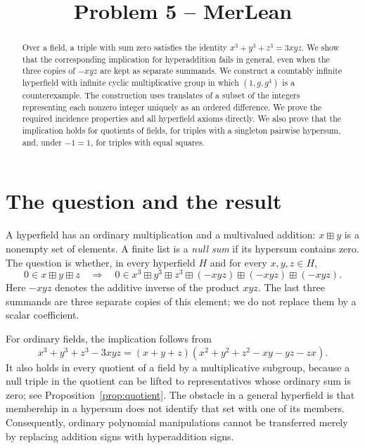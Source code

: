 \documentclass[11pt]{article}
\title{Problem 5 -- MerLean}
\author{}
\date{}
\theoremstyle{remark}
\newcommand{\hs}{\boxplus}
\begin{document}
\maketitle

\begin{abstract}
Over a field, a triple with sum zero satisfies the identity
$x^3+y^3+z^3=3xyz$. We show that the corresponding implication for
hyperaddition fails in general, even when the three copies of $-xyz$ are
kept as separate summands. We construct a countably infinite hyperfield
with infinite cyclic multiplicative group in which $(1,g,g^4)$ is a
counterexample. The construction uses translates of a subset of the
integers representing each nonzero integer uniquely as an ordered
difference. We prove the required incidence properties and all
hyperfield axioms directly. We also prove that the implication holds
for quotients of fields, for triples with a singleton pairwise
hypersum, and, under $-1=1$, for triples with equal squares.
\end{abstract}

\section{The question and the result}

A hyperfield has an ordinary multiplication and a multivalued addition:
$x\hs y$ is a nonempty set of elements. A finite list is a
\emph{null sum} if its hypersum contains zero. The question is whether,
in every hyperfield $H$ and for every $x,y,z\in H$,
\begin{equation}\label{eq:question}
 0\in x\hs y\hs z
 \quad\Longrightarrow\quad
 0\in x^3\hs y^3\hs z^3\hs(-xyz)\hs(-xyz)\hs(-xyz).
\end{equation}
Here $-xyz$ denotes the additive inverse of the product $xyz$.
The last three summands are three separate copies of this element;
we do not replace them by a scalar coefficient.

For ordinary fields, the implication follows from
\begin{equation}\label{eq:field-identity}
 x^3+y^3+z^3-3xyz
 =(x+y+z)(x^2+y^2+z^2-xy-yz-zx).
\end{equation}
It also holds in every quotient of a field by a multiplicative subgroup,
because a null triple in the quotient can be lifted to representatives
whose ordinary sum is zero; see Proposition~\ref{prop:quotient}.
The obstacle in a general hyperfield is that membership in a hypersum
does not identify that set with one of its members. Consequently,
ordinary polynomial manipulations cannot be transferred merely by
replacing addition signs with hyperaddition signs.
\end{document}
